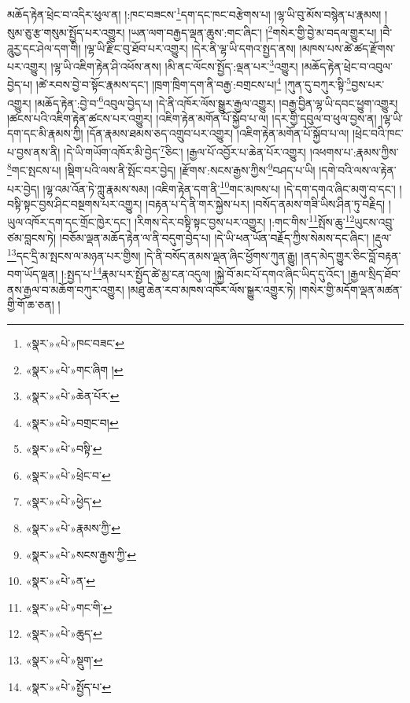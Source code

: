 མཆོད་རྟེན་ཕྲེང་བ་འདིར་ཕུལ་ན། །:ཁང་བཟངས་\footnote{«སྣར་»«པེ་»ཁང་བཟང་}དག་དང་ཁང་བརྩེགས་པ། །ལྷ་ཡི་བུ་མོས་བསྙེན་པ་རྣམས། །སུམ་ཅུ་རྩ་གསུམ་སྤྱོད་པར་འགྱུར། །ཡན་ལག་བརྒྱད་ལྡན་ཆུས་:གང་ཞིང་། །\footnote{«སྣར་»«པེ་»གང་ཞིག །}གསེར་གྱི་བྱེ་མ་བདལ་གྱུར་པ། །བཻ་ཌཱུརྱ་དང་ཤེལ་དག་གི། །ལྷ་ཡི་རྫིང་བུ་ཐོབ་པར་འགྱུར། །དེར་ནི་ལྷ་ཡི་དགའ་སྤྱད་ནས། །མཁས་པས་ཚེ་ཚད་རྫོགས་པར་འགྱུར། །ལྷ་ཡི་འཇིག་རྟེན་ཤི་འཕོས་ནས། །མི་ནང་ལོངས་སྤྱོད་:ལྡན་པར་\footnote{«སྣར་»«པེ་»ཆེན་པོར་}འགྱུར། །མཆོད་རྟེན་ཕྲེང་བ་འབུལ་བྱེད་པ། །ཚེ་རབས་བྱེ་བ་སྟོང་རྣམས་དང་། །ཁྲག་ཁྲིག་དག་ནི་བརྒྱ་:བགྲངས་པ།\footnote{«སྣར་»«པེ་»བགྲང་བ།} །ཀུན་དུ་བཀུར་སྟི་\footnote{«སྣར་»«པེ་»བསྟི་}བྱས་པར་འགྱུར། །མཆོད་རྟེན་:བྱེ་བ་\footnote{«སྣར་»«པེ་»ཕྲེང་བ་}འབུལ་བྱེད་པ། །དེ་ནི་འཁོར་ལོས་སྒྱུར་རྒྱལ་འགྱུར། །བརྒྱ་བྱིན་ལྷ་ཡི་དབང་ཕྱུག་འགྱུར། །ཚངས་པའི་འཇིག་རྟེན་ཚངས་པར་འགྱུར། །འཇིག་རྟེན་མགོན་པོ་སྐྱོབ་པ་ལ། །དར་གྱི་དབུལ་བ་ཕུལ་བྱས་ན། །ལྷ་ཡི་དག་དང་མི་རྣམས་ཀྱི། །དོན་རྣམས་ཐམས་ཅད་འགྲུབ་པར་འགྱུར། །འཇིག་རྟེན་མགོན་པོ་སྐྱོབ་པ་ལ། །ཕྲེང་བའི་ཁང་པ་བྱས་ནས་ནི། །དེ་ཡི་གཡོག་འཁོར་མི་བྱེད་\footnote{«སྣར་»«པེ་»ཕྱེད་}ཅིང་། །རྒྱལ་པོ་འབྱོར་པ་ཆེན་པོར་འགྱུར། །འཕགས་པ་:རྣམས་ཀྱིས་\footnote{«སྣར་»«པེ་»རྣམས་ཀྱི་}གང་སྤངས་པ། །སྡིག་པའི་ལས་ནི་སྤོང་བར་བྱེད། །རྫོགས་:སངས་རྒྱས་ཀྱིས་\footnote{«སྣར་»«པེ་»སངས་རྒྱས་ཀྱི་}བཤད་པ་ཡི། །དགེ་བའི་ལས་ལ་རྟེན་པར་བྱེད། །ལྷ་འམ་འོན་ཏེ་ཀླུ་རྣམས་སམ། །འཇིག་རྟེན་དག་ནི་\footnote{«སྣར་»«པེ་»ན་}གང་མཁས་པ། །དེ་དག་དགའ་ཞིང་མགུ་བ་དང་། །བསྟི་སྟང་བྱས་ཤིང་བསྔགས་པར་འགྱུར། །བརྟན་པ་དེ་ནི་གར་སྐྱེས་པར། །བསོད་ནམས་གཟི་ཡིས་ཤིན་ཏུ་བརྗིད། །ཡུལ་འཁོར་དག་དང་གྲོང་ཁྱེར་དང་། །རིགས་དེར་བསྟི་སྟང་བྱས་པར་འགྱུར། །:གང་གིས་\footnote{«སྣར་»«པེ་»གང་གི་}སྤོས་ཆུ་\footnote{«སྣར་»«པེ་»ཆུད་}ཡུངས་འབྲུ་ཙམ་བླངས་ཏེ། །བཅོམ་ལྡན་མཆོད་རྟེན་ལ་ནི་བདུག་བྱེད་པ། །དེ་ཡི་ཕན་ཡོན་བརྗོད་ཀྱིས་སེམས་དང་ཞིང་། །རྡུལ་\footnote{«སྣར་»«པེ་»སྡུག་}དང་དྲི་མ་སྤངས་ལ་མཉན་པར་གྱིས། །དེ་ནི་བསོད་ནམས་ལྡན་ཞིང་ཕྱོགས་ཀུན་རྒྱུ། །ནད་མེད་གྱུར་ཅིང་བློ་བརྟན་བག་ཡོད་ལྡན། །:སྤྱད་པ་\footnote{«སྣར་»«པེ་»སྤྱོད་པ་}རྣམ་པར་སྤྱོད་ཚེ་མྱ་ངན་འདུལ། །སྐྱེ་བོ་མང་པོ་དགའ་ཞིང་ཡིད་དུ་འོང་། །རྒྱལ་སྲིད་ཐོབ་ནས་རྒྱལ་བ་མཆོག་བཀུར་འགྱུར། །མཐུ་ཆེན་རབ་མཁས་འཁོར་ལོས་སྒྱུར་འགྱུར་ཏེ། །གསེར་གྱི་མདོག་ལྡན་མཚན་གྱི་གོ་ཆ་ཅན། །
